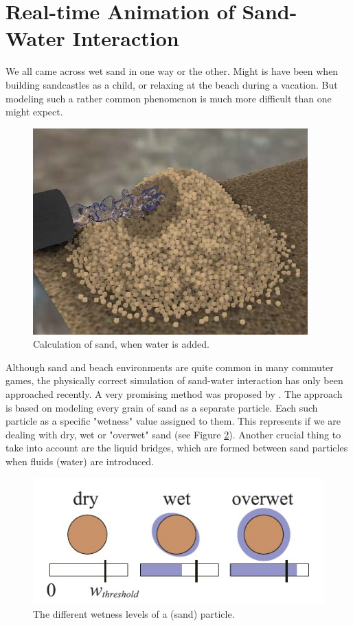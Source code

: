 \section{Real-time Animation of Sand-Water Interaction}
We all came across wet sand in one way or the other. Might is have been when building sandcastles as a child, or relaxing at the beach during a vacation. But modeling such a rather common phenomenon is much more difficult than one might expect.

\begin{figure}[htb]
	\centering
	\includegraphics[width=\linewidth]{RSKN08/pileofsand.jpg}
	\caption{Calculation of sand, when water is added.}
	\label{fig:pileofsand}
\end{figure}

Although sand and beach environments are quite common in many commuter games, the physically correct simulation of sand-water interaction has only been approached recently. A very promising method was proposed by \cite{rungjiratananon2008real}. The approach is based on modeling every grain of sand as a separate particle. Each such particle as a specific "wetness" value assigned to them. This represents if we are dealing with dry, wet or "overwet" sand (see Figure \ref{fig:wetness}). Another crucial thing to take into account are the liquid bridges, which are formed between sand particles when fluids (water) are introduced.

\begin{figure}[htb]
	\centering
	\includegraphics[width=\linewidth]{RSKN08/wetness.jpg}
	\caption{The different wetness levels of a (sand) particle.}
	\label{fig:wetness}
\end{figure}

